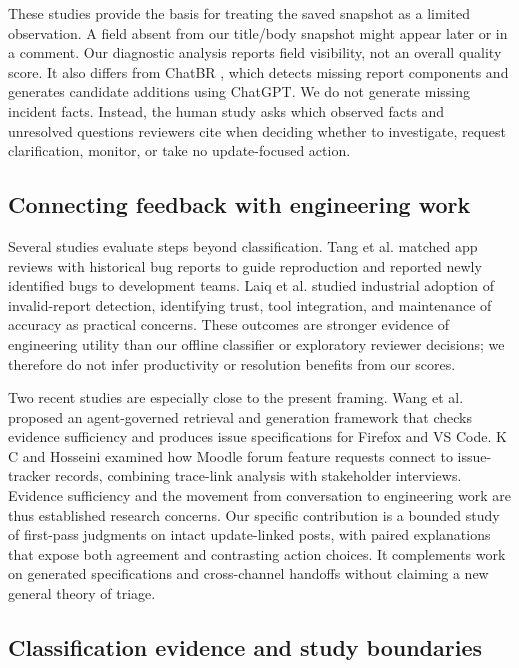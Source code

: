\documentclass[conference,letterpaper]{IEEEtran}
\begin{document}
These studies provide the basis for treating the saved snapshot as a limited observation. A field absent from our title/body snapshot might appear later or in a comment. Our diagnostic analysis reports field visibility, not an overall quality score. It also differs from ChatBR \cite{Bo2024ChatBR}, which detects missing report components and generates candidate additions using ChatGPT. We do not generate missing incident facts. Instead, the human study asks which observed facts and unresolved questions reviewers cite when deciding whether to investigate, request clarification, monitor, or take no update-focused action.

\subsection{Connecting feedback with engineering work}

Several studies evaluate steps beyond classification. Tang et al. \cite{Tang2024ReviewBugs} matched app reviews with historical bug reports to guide reproduction and reported newly identified bugs to development teams. Laiq et al. \cite{Laiq2024Industrial} studied industrial adoption of invalid-report detection, identifying trust, tool integration, and maintenance of accuracy as practical concerns. These outcomes are stronger evidence of engineering utility than our offline classifier or exploratory reviewer decisions; we therefore do not infer productivity or resolution benefits from our scores.

Two recent studies are especially close to the present framing. Wang et al. \cite{Wang2026Evidence} proposed an agent-governed retrieval and generation framework that checks evidence sufficiency and produces issue specifications for Firefox and VS Code. K C and Hosseini \cite{KC2026Moodle} examined how Moodle forum feature requests connect to issue-tracker records, combining trace-link analysis with stakeholder interviews. Evidence sufficiency and the movement from conversation to engineering work are thus established research concerns. Our specific contribution is a bounded study of first-pass judgments on intact update-linked posts, with paired explanations that expose both agreement and contrasting action choices. It complements work on generated specifications and cross-channel handoffs without claiming a new general theory of triage.

\subsection{Classification evidence and study boundaries}
\end{document}

